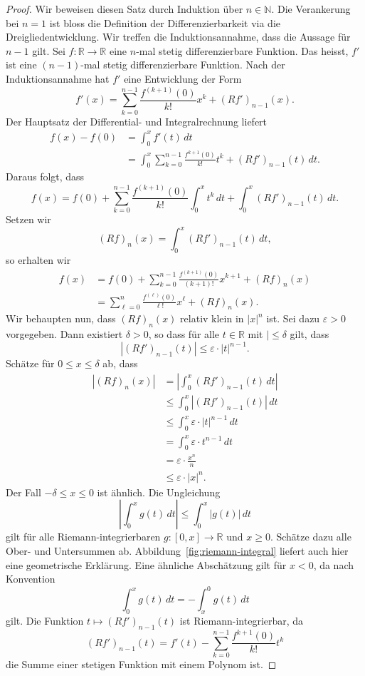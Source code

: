 \documentclass[../main.tex]{subfiles}
\begin{document}
\begin{proof}
  Wir beweisen diesen Satz durch Induktion über $n \in \mathbb{N}$.
  Die Verankerung bei $n = 1$ ist bloss die Definition der Differenzierbarkeit
  via die Dreigliedentwicklung.
  Wir treffen die Induktionsannahme, dass die Aussage für $n-1$ gilt.
  Sei $f \colon \mathbb{R} \to \mathbb{R}$ eine $n$-mal stetig differenzierbare Funktion.
  Das heisst, $f'$ ist eine $(n-1)$-mal stetig differenzierbare Funktion.
  Nach der Induktionsannahme hat $f'$ eine Entwicklung der Form
  \[
    f'(x) = \sum_{k=0}^{n-1} \frac{f^{(k+1)}(0)}{k!}x^k + {(Rf')}_{n-1}(x).
  \]
  Der Hauptsatz der Differential- und Integralrechnung liefert
  \begin{align*}
    f(x) - f(0) & = \int_{0}^{x} f'(t) \, dt \\
                & = \int_{0}^{x} \sum_{k=0}^{n-1} \frac{f^{k+1}(0)}{k!}t^k
                + {(Rf')}_{n-1}(t)\, dt.
  \end{align*}
  Daraus folgt, dass
  \[
    f(x) = f(0) + \sum_{k=0}^{n-1} \frac{f^{(k+1)}(0)}{k!} \int_{0}^{x} t^k \, dt
    + \int_{0}^{x} {(Rf')}_{n-1}(t) \, dt.
  \]
  Setzen wir
  \[
    {(Rf)}_n(x) = \int_{0}^{x} {(Rf')}_{n-1}(t) \, dt,
  \]
  so erhalten wir
  \begin{align*}
    f(x) & = f(0) + \sum_{k=0}^{n-1} \frac{f^{(k+1)}(0)}{(k+1)!}x^{k+1} + {(Rf)}_n(x) \\
         & = \sum_{\ell=0}^{n} \frac{f^{(\ell)}(0)}{\ell!}x^{\ell} + {(Rf)}_n(x).
  \end{align*}
  Wir behaupten nun, dass ${(Rf)}_n(x)$ relativ klein in $|x|^n$ ist.
  Sei dazu $\varepsilon > 0$ vorgegeben. Dann existiert $\delta > 0$,
  so dass für alle $t \in \mathbb{R}$ mit $| \leq \delta$ gilt,
  dass
  \[
    |{(Rf')}_{n-1}(t)| \leq \varepsilon \cdot |t|^{n-1}.
  \]
  Schätze für $0 \leq x \leq \delta$ ab, dass
  \begin{align*}
    |{(Rf)}_n(x)| 
    &= \left| \int_{0}^{x} {(Rf')}_{n-1}(t) \, dt \right|  \\
    &\leq \int_{0}^{x} |{(Rf')}_{n-1}(t)| \, dt \\
    &\leq \int_{0}^{x} \varepsilon \cdot |t|^{n-1} \, dt \\
    &= \int_{0}^{x} \varepsilon \cdot t^{n-1} \, dt \\
    &= \varepsilon \cdot \frac{x^n}{n} \\
    &\leq \varepsilon \cdot |x|^n.
  \end{align*}
  Der Fall $-\delta \leq x \leq 0$ ist ähnlich.
  Die Ungleichung
  \[
    \left| \int_{0}^{x} g(t) \, dt \right| \leq \int_{0}^{x} |g(t)| \, dt
  \]
  gilt für alle Riemann-integrierbaren $g \colon [0, x] \to \mathbb{R}$
  und $x \geq 0$.
  Schätze dazu alle Ober- und Untersummen ab.
  Abbildung~\ref{fig:riemann-integral} liefert auch hier eine geometrische Erklärung.
  Eine ähnliche Abschätzung gilt für $x < 0$, da nach Konvention
  \[
    \int_{0}^{x} g(t) \, dt = - \int_{x}^{0} g(t) \, dt
  \]
  gilt.
  Die Funktion $t \mapsto {(Rf')}_{n-1}(t)$ ist Riemann-integrierbar, da
  \[
    {(Rf')}_{n-1}(t) = f'(t) - \sum_{k=0}^{n-1} \frac{f^{k+1}(0)}{k!}t^k
  \]
  die Summe einer stetigen Funktion mit einem Polynom ist.
\end{proof}
\end{document}
